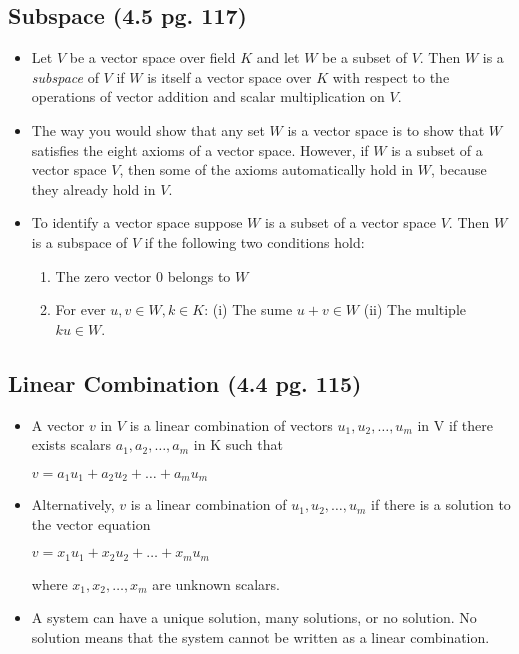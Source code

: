 \documentclass[hidelinks, 11pt, openleft]{scrartcl}
\begin{document}
    \subsection*{Subspace (4.5 pg. 117)}
    \begin{itemize}
        \item Let $V$ be a vector space over field $K$ and let $W$ be a subset of $V$. Then $W$ is a \textit{subspace} of $V$ if $W$ is itself a vector space over $K$ with respect to the operations of vector addition and scalar multiplication on $V$.
        \item The way you would show that any set $W$ is a vector space is to show that $W$ satisfies the eight axioms of a vector space. However, if $W$ is a subset of a vector space $V$, then some of the axioms automatically hold in $W$, because they already hold in $V$. 
        \item To identify a vector space suppose $W$ is a subset of a vector space $V$. Then $W$ is a subspace of $V$ if the following two conditions hold:
            \begin{enumerate}
                \item The zero vector 0 belongs to $W$
                \item For ever $u, v \in W, k \in K$: (i) The sume $u+v \in W$ (ii) The multiple $ku \in W$.
            \end{enumerate}
    \end{itemize}
    
    \subsection*{Linear Combination (4.4 pg. 115)}
    \begin{itemize}
    \item A vector $v$ in $V$ is a linear combination of vectors $u_{1}, u_{2}, \dots , u_{m}$ in V if there exists scalars $a_{1}, a_{2}, \dots , a_{m}$ in K such that
        \begin{center}
            $v = a_{1}u_{1} + a_{2}u_{2} + \dots + a_{m}u_{m}$
        \end{center}
    \item Alternatively, $v$ is a linear combination of $u_{1}, u_{2}, \dots , u_{m}$ if there is a solution to the vector equation
        \begin{center}
            $v = x_{1}u_{1} + x_{2}u_{2} + \dots + x_{m}u_{m}$
        \end{center}
    where $x_{1},x_{2}, \dots , x_{m}$ are unknown scalars.
        \item A system can have a unique solution, many solutions, or no solution. No solution means that the system cannot be written as a linear combination.
    \end{itemize}
    
\end{document}
